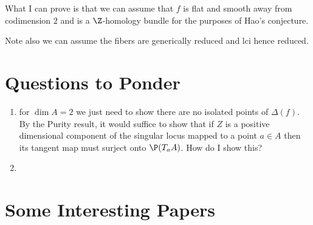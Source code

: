 \documentclass[12pt]{article}
\theoremstyle{plain}
\begin{document}
What I can prove is that we can assume that $f$ is flat and smooth away from codimension $2$ and is a $\Z$-homology bundle for the purposes of Hao's conjecture.

Note also we can assume the fibers are generically reduced and lci hence reduced. 

\section{Questions to Ponder}

\begin{enumerate}
\item for $\dim{A} = 2$ we just need to show there are no isolated points of $\Delta(f)$. By the Purity result, it would suffice to show that if $Z$ is a positive dimensional component of the singular locus mapped to a point $a \in A$ then its tangent map must surject onto $\P(T_a A)$. How do I show this?

\item 
\end{enumerate}

\section{Some Interesting Papers}
\end{document}
